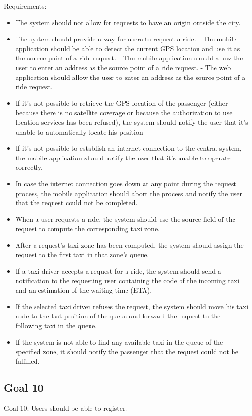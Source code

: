 \documentclass{book}
\begin{document}
Requirements:
\begin{itemize}
\item The system should not allow for requests to have an origin outside the city. 
\item The system should provide a way for users to request a ride.
	- The mobile application should be able to detect the current GPS location and use it as the source point of a ride request.
	- The mobile application should allow the user to enter an address as the source point of a ride request.
	- The web application should allow the user to enter an address as the source point of a ride request.
\item If it’s not possible to retrieve the GPS location of the passenger (either because there is no satellite coverage or because the authorization to use location services has been refused), the system should notify the user that it’s unable to automatically locate his position.
\item If it’s not possible to establish an internet connection to the central system, the mobile application should notify the user that it’s unable to operate correctly.
\item In case the internet connection goes down at any point during the request process, the mobile application should abort the process and notify the user that the request could not be completed.
\item When a user requests a ride, the system should use the source field of the request to compute the corresponding taxi zone. 
\item After a request’s taxi zone has been computed, the system should assign the request to the first taxi in that zone’s queue.
\item If a taxi driver accepts a request for a ride, the system should send a notification to the requesting user containing the code of the incoming taxi and an estimation of the waiting time (ETA).
\item If the selected taxi driver refuses the request, the system should move his taxi code to the last position of the queue and forward the request to the following taxi in the queue.
\item If the system is not able to find any available taxi in the queue of the specified zone, it should notify the passenger that the request could not be fulfilled. 
\end{itemize}

\subsection{Goal 10}
Goal 10: Users should be able to register.
\end{document}
